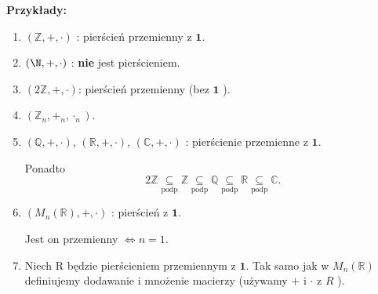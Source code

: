 \noindent \textbf{Przykłady:} 
\begin{enumerate}[label=\arabic*)]
	\item $\left( \mathbb{Z} , +, \cdot  \right) $ : pierścień przemienny z $\mathbf{1}$.
	\item $\left( \N, +, \cdot  \right) $ : \textbf{nie} jest pierścieniem. 
	\item $\left( 2\mathbb{Z}, +, \cdot  \right) $: pierścień przemienny (bez $\mathbf{1}$ ).
	\item $\left( \mathbb{Z} _{n}, +_{\scriptscriptstyle n}, \cdot _{\scriptscriptstyle n} \right) $.
	\item $\left( \mathbb{Q} , +,\cdot  \right) $, $\left( \mathbb{R} , +, \cdot  \right) $, $\left( \mathbb{C}, +, \cdot  \right) $ : pierścienie przemienne z $\mathbf{1}$.

	Ponadto \[
	2\mathbb{Z} \underset{\scriptscriptstyle\text{podp}}{\subseteq} \mathbb{Z} \underset{\scriptscriptstyle\text{podp}}{\subseteq} \mathbb{Q} \underset{\scriptscriptstyle\text{podp}}{\subseteq} \mathbb{R} \underset{\scriptscriptstyle\text{podp}}{\subseteq} \mathbb{C} 
	.\] 
	\item $\left( M_{n}\left( \mathbb{R}  \right), +, \cdot  \right) $ : pierścień z $\mathbf{1}$.

	Jest on przemienny $\iff n=1$.
    	\item Niech R będzie pierścieniem przemiennym z $\mathbf{1}$. Tak samo jak w $M_{n}\left( \mathbb{R}  \right) $ definiujemy dodawanie i mnożenie macierzy (używamy $+$ i $\cdot $ z $R$ ).
	

\end{enumerate}
